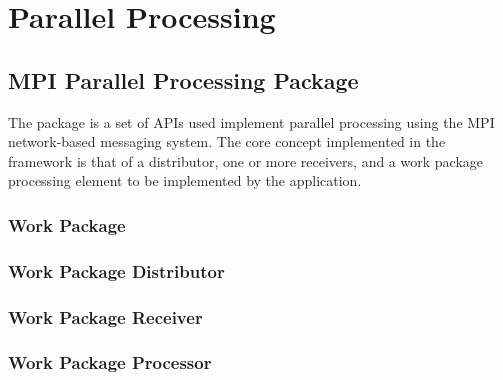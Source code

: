 %
%
\chapter{Parallel Processing}
\label{chp-parallel}

\section{MPI Parallel Processing Package}
The  package is a set of APIs used implement parallel processing
using the MPI~\cite{mpi} network-based messaging system. The core concept
implemented in the framework is that of a distributor, one or more receivers,
and a work package processing element to be implemented by the application.

\subsection{Work Package}
\label{sec-workpackage}

\subsection{Work Package Distributor}
\label{sec-workpackagedistributor}

\subsection{Work Package Receiver}
\label{sec-workpackagereceiver}

\subsection{Work Package Processor}
\label{sec-workpackageprocessor}

